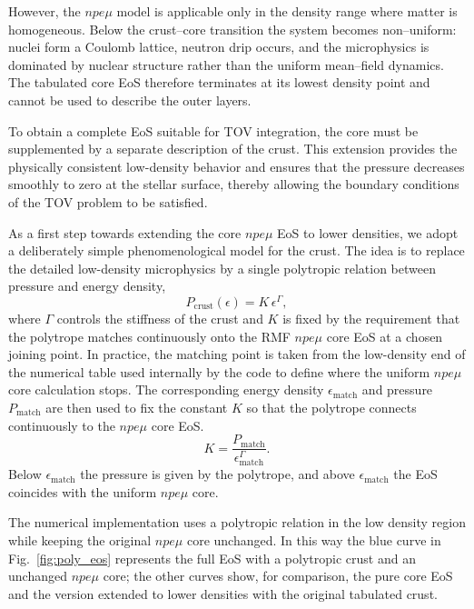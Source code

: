 However, the $npe\mu$ model is applicable only in the density range where
matter is homogeneous. Below the crust–core transition the system becomes
non–uniform: nuclei form a Coulomb lattice, neutron drip occurs, and the
microphysics is dominated by nuclear structure rather than the uniform
mean–field dynamics. The tabulated core EoS therefore terminates at its
lowest density point and cannot be used to describe the outer layers.

To obtain a complete EoS suitable for TOV integration, the core
must be supplemented by a separate description of the crust. This extension
provides the physically consistent low-density behavior and ensures that the
pressure decreases smoothly to zero at the stellar surface, thereby allowing
the boundary conditions of the TOV problem to be satisfied.

As a first step towards extending the core $npe\mu$ EoS to
lower densities, we adopt a deliberately simple phenomenological
model for the crust. The idea is to replace the detailed
low-density microphysics by a single polytropic relation between pressure
and energy density,
\begin{equation}
  P_{\text{crust}}(\epsilon)
  = K\,\epsilon^{\Gamma},
\end{equation}
where $\Gamma$ controls the stiffness of the crust and $K$ is fixed by the
requirement that the polytrope matches continuously onto the RMF $npe\mu$ core
EoS at a chosen joining point. 
In practice, the matching point is taken from the low-density end of the
numerical table used internally by the code to define where the uniform
$npe\mu$ core calculation stops. The corresponding energy density
$\epsilon_{\mathrm{match}}$ and pressure $P_{\mathrm{match}}$ are then used to
fix the constant $K$ so that the polytrope connects continuously to the
$npe\mu$ core EoS.
\begin{equation}
  K = \frac{P_{\mathrm{match}}}{\epsilon_{\mathrm{match}}^{\Gamma}}.
\end{equation}
Below $\epsilon_{\mathrm{match}}$ the pressure is given by the polytrope,
and above $\epsilon_{\mathrm{match}}$ the EoS coincides with the uniform
$npe\mu$ core.

The numerical implementation uses a polytropic relation in the low density 
region while keeping the original $npe\mu$
core unchanged. In this way the blue curve in
Fig.~\ref{fig:poly_eos} represents the full EoS with a polytropic crust
and an unchanged $npe\mu$ core; the other curves show, for comparison, the
pure core EoS and the version extended to lower densities with the original
tabulated crust.


